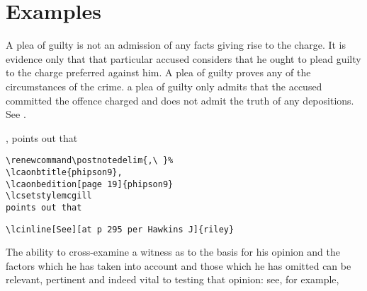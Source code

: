 \newpage
\lcsetstylemcgill
\section{Examples}

\begin{myquotation}
A plea of guilty is not an
admission of any facts giving rise to the charge. It is
evidence only that that particular accused considers that he
ought to plead guilty to the charge preferred against him. A
plea of guilty  proves any of the circumstances of the
crime.  a
plea of guilty only admits that the accused committed the
offence charged and does not admit the truth of any
depositions. See . 
\end{myquotation}

\renewcommand\postnotedelim{,\ }%
, 
\lcsetstylemcgill
points out that

\renewcommand\postnotedelim{,\ }%
\fbox{, }
\lcsetstylemcgill
{}


\begin{magpar}
\begin{verbatim}
\renewcommand\postnotedelim{,\ }%
\lcaonbtitle{phipson9}, 
\lcaonbedition[page 19]{phipson9} 
\lcsetstylemcgill
points out that
\end{verbatim}
\end{magpar}


\bigskip
{}


\begin{magpar}
\begin{verbatim}
\lcinline[See][at p 295 per Hawkins J]{riley}
\end{verbatim}
\end{magpar}

%

\newpage
\begin{myquotation}
The ability to cross-examine a witness as to the basis for his opinion and the factors which he has taken into account and those which he has omitted can be relevant, pertinent and indeed vital to testing  that opinion: see, for example, 
\end{myquotation}


